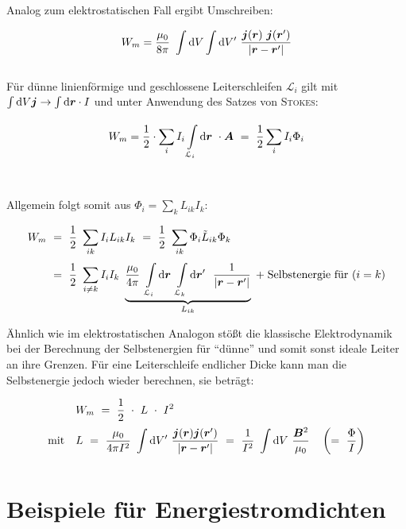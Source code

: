 Analog zum elektrostatischen Fall ergibt Umschreiben:

\begin{equation*}
W_m = \frac{\mu_0}{8\pi} \ \int\d V \int\d V' \ \frac{\vec{j}(\vec{r}) \ \vec{j}(\vec{r}')}{|\vec{r}-\vec{r}'|}
\end{equation*}
\ \\

Für dünne linienförmige und geschlossene Leiterschleifen $\mathcal{L}_i$ gilt mit $\int\mathrm{d} V\bm{j} \rightarrow \int\mathrm{d} \bm{r} \cdot I$ und unter Anwendung des Satzes von \textsc{Stokes}:

\begin{equation*}
W_m = \frac{1}{2} \cdot \sum_i I_i \int\limits_{{\mathcal{L}_i}}^{{}}\mathrm{d}{\bm{r}}\  \cdot \bm{A} \ = \ \frac{1}{2} \sum_i I_i \Phi_i
\end{equation*}
\ \\
\ \\
Allgemein folgt somit aus $\Phi_i = \sum_k L_{ik} I_k$:

\begin{align*}
W_m \ &= \ \frac{1}{2} \ \sum_{ik}  I_i L_{ik} I_k \ = \ \frac{1}{2} \ \sum_{ik} \Phi_i \tilde{L}_{ik} \Phi_k\\
&= \ \frac{1}{2} \ \sum_{i\neq k} I_i I_k \ \underbrace{\frac{\mu_0}{4\pi} \ \Int{\mathcal{L}_i}{}{\vec{r}} \Int{\mathcal{L}_k}{}{\vec{r}'} \ \frac{1}{|\vec{r}-\vec{r}'|}}_{L_{ik}} \; + \; \text{Selbstenergie für } (i=k)
\end{align*}

Ähnlich wie im elektrostatischen Analogon stößt die klassische Elektrodynamik bei der Berechnung der Selbstenergien für ``dünne'' und somit sonst ideale Leiter an ihre Grenzen. Für eine Leiterschleife endlicher Dicke kann man die Selbstenergie jedoch wieder berechnen, sie beträgt:

\begin{align*}
& \ W_m  \ = \ \frac{1}{2} \ \cdot  \ L \ \cdot \ I^2 \\
\text{mit } \ & \ L \ = \ \frac{\mu_0}{4\pi I^2}\ \Int{}{}{V'} \frac{\vec{j}(\vec{r})\vec{j}(\vec{r}')}{|\vec{r}-\vec{r}'|} \ = \ \frac{1}{I^2} \ \Int{}{}{V} \frac{\vec{B}^2}{\mu_0} \quad
 \left( = \ \frac{\Phi}{I}\right) 
\end{align*}

\section{Beispiele für Energiestromdichten}

